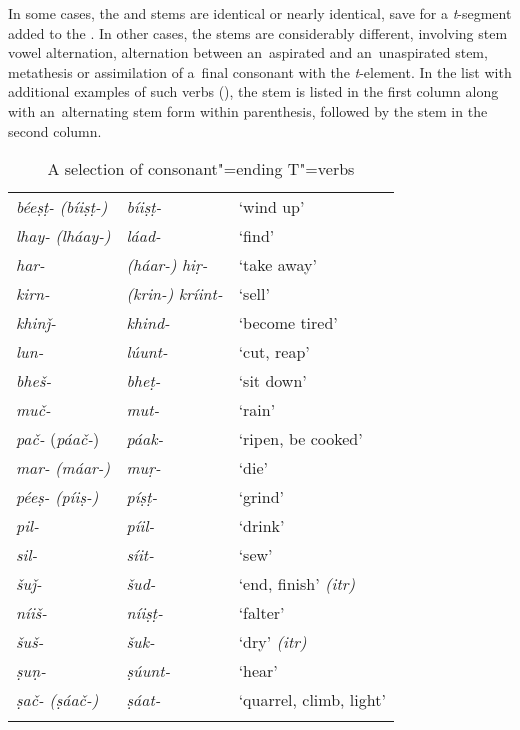In some cases, the  and  stems are identical or nearly identical, save for a \textit{t}-segment added to the . In other cases, the stems are considerably different, involving stem vowel alternation, alternation between an~aspirated and an~unaspirated stem, metathesis or assimilation of a~final consonant with the  \textit{t}-element. In the list with additional examples of such verbs (), the  stem is listed in the first column along with an~alternating  stem form within parenthesis, followed by the  stem in the second column.


\begin{table}
\caption{A selection of consonant"=ending T"=verbs}
\begin{tabularx}{\textwidth}{ l@{\hspace{40pt}} l@{\hspace{40pt}} Q }
\lsptoprule
\textit{béeṣṭ-} \textit{(bíiṣṭ-)} &
\textit{bíiṣṭ-}	&
`wind up' \\
\textit{lhay-} \textit{(lháay-)}	&
\textit{láad-}	&
`find' \\
\textit{har-} &
\textit{(háar-)}	\textit{hiṛ-}	&
`take away' \\
\textit{kirn-} &
\textit{(krin-)} \textit{kríint-}	&
`sell' \\
\textit{khinǰ-}&
\textit{khind-}	&
`become tired' \\
\textit{lun-} &
\textit{lúunt-}	&
`cut, reap' \\
\textit{bheš-} &
\textit{bheṭ-}	&
`sit down' \\
\textit{muč-} &
\textit{mut-}	&
`rain' \\
\textit{\textit{pač-}} (\textit{páač-})	&
\textit{páak-}	&
`ripen, be cooked' \\
\textit{mar-} \textit{(máar-)}&
\textit{muṛ-}	&
`die' \\
\textit{péeṣ-} \textit{(píiṣ-)} &
\textit{píṣṭ-}	&
`grind' \\
\textit{pil-} &\textit{píil-}	&
`drink' \\
\textit{sil-} &\textit{síit-}	&
`sew' \\
\textit{šuǰ-} &\textit{šud-}	&
`end, finish' \textit{(itr)}\\
\textit{níiš-} &\textit{níiṣṭ-}	&
`falter' \\
\textit{šuš-} &\textit{šuk-}	&
`dry'  \textit{(itr)} \\
\textit{ṣuṇ-} &\textit{ṣúunt-}	&
`hear' \\
\textit{ṣač-} \textit{(ṣáač-)} &	\textit{ṣáat-}	&
`quarrel, climb, light' \\\lspbottomrule
\end{tabularx}
\label{tab:8-tc}
\end{table}

